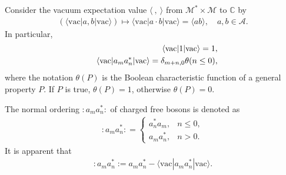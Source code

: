 \documentclass[11pt,reqno]{amsart}
\numberwithin{equation}{section}
\begin{document}
Consider the vacuum expectation value $\langle\ , \ \rangle$ from $\mathcal{M}^{\ast}\times\mathcal{M}$ to $\mathbb{C}$ by
\begin{eqnarray}
(\langle\text{vac}|a,b|\text{vac}\rangle)\mapsto \langle\text{vac}|a\cdot b|\text{vac}\rangle=\langle ab\rangle,\quad a,b\in\mathcal{A}.
\end{eqnarray}
In particular,
\begin{eqnarray}
&&\langle\text{vac}|1|\text{vac}\rangle=1,\notag\\
&&\langle\text{vac}|a_{m}a^{\ast}_{n}|\text{vac}\rangle=\delta_{m+n,0}\theta(n\leq0),
\end{eqnarray}
where the notation $\theta(P)$ is the Boolean characteristic function of a general property $P$. If $P$ is true, $\theta(P)=1$, otherwise $\theta(P)=0$.



The normal ordering $:a_{m}a^{\ast}_{n}:$ of charged free bosons is denoted  as
\begin{eqnarray}
:a_{m}a^{\ast}_{n}: = \begin{cases}
a^{\ast}_{n}a_{m}, &n\leq0, \\
a_{m}a^{\ast}_{n}, &n>0.
\end{cases}
\end{eqnarray}
It is apparent that
\begin{eqnarray}
:a_{m}a^{\ast}_{n}:=a_{m}a^{\ast}_{n}-\langle\text{vac}|a_{m}a^{\ast}_{n}|\text{vac}\rangle.
\end{eqnarray}
\end{document}
